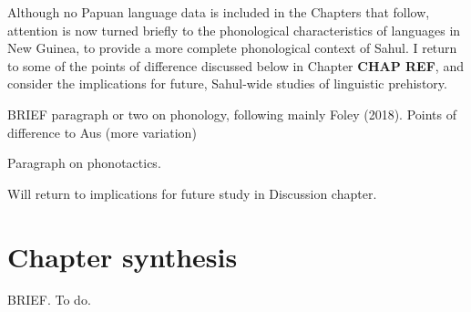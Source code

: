 Although no Papuan language data is included in the Chapters that follow, attention is now turned briefly to the phonological characteristics of languages in New Guinea, to provide a more complete phonological context of Sahul. I return to some of the points of difference discussed below in Chapter \textbf{CHAP REF}, and consider the implications for future, Sahul-wide studies of linguistic prehistory.

BRIEF paragraph or two on phonology, following mainly Foley (2018). Points of difference to Aus (more variation)

Paragraph on phonotactics.

Will return to implications for future study in Discussion chapter.

\hypertarget{chapter-synthesis}{%
\section{Chapter synthesis}\label{chapter-synthesis}}

BRIEF. To do.


